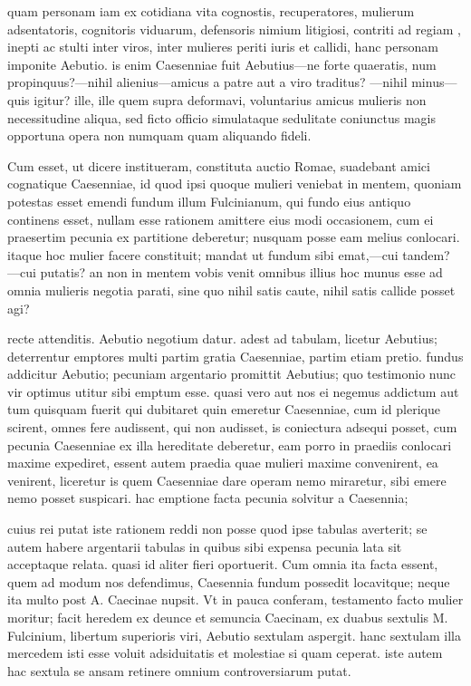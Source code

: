  quam personam iam ex cotidiana vita cognostis, recuperatores, mulierum adsentatoris, cognitoris viduarum, defensoris nimium litigiosi, contriti ad regiam , inepti ac stulti inter viros, inter mulieres periti iuris et callidi, hanc personam imponite Aebutio. is enim Caesenniae fuit Aebutius—ne forte quaeratis, num propinquus?—nihil alienius—amicus a patre aut a viro traditus? —nihil minus—quis igitur? ille, ille quem supra deformavi, voluntarius amicus mulieris non necessitudine aliqua, sed ficto officio simulataque sedulitate coniunctus magis opportuna opera non numquam quam aliquando fideli.

 Cum esset, ut dicere institueram, constituta auctio Romae, suadebant amici cognatique Caesenniae, id quod ipsi quoque mulieri veniebat in mentem, quoniam potestas esset emendi fundum illum Fulcinianum, qui fundo eius antiquo continens esset, nullam esse rationem amittere eius modi occasionem, cum ei praesertim pecunia ex partitione deberetur; nusquam posse eam melius conlocari. itaque hoc mulier facere constituit; mandat ut fundum sibi emat,—cui tandem? —cui putatis? an non in mentem vobis venit omnibus illius hoc munus esse ad omnia mulieris negotia parati, sine quo nihil satis caute, nihil satis callide posset agi?

 recte attenditis. Aebutio negotium datur. adest ad tabulam, licetur Aebutius; deterrentur emptores multi partim gratia Caesenniae, partim etiam pretio. fundus addicitur Aebutio; pecuniam argentario promittit Aebutius; quo testimonio nunc vir optimus utitur sibi emptum esse. quasi vero aut nos ei negemus addictum aut tum quisquam fuerit qui dubitaret quin emeretur Caesenniae, cum id plerique scirent, omnes fere audissent, qui non audisset, is coniectura adsequi posset, cum pecunia Caesenniae ex illa hereditate deberetur, eam porro in praediis conlocari maxime expediret, essent autem praedia quae mulieri maxime convenirent, ea venirent, liceretur is quem Caesenniae dare operam nemo miraretur, sibi emere nemo posset suspicari. hac emptione facta pecunia solvitur a Caesennia;

 cuius rei putat iste rationem reddi non posse quod ipse tabulas averterit; se autem habere argentarii tabulas in quibus sibi expensa pecunia lata sit acceptaque relata. quasi id aliter fieri oportuerit. Cum omnia ita facta essent, quem ad modum nos defendimus, Caesennia fundum possedit locavitque; neque ita multo post A. Caecinae nupsit. Vt in pauca conferam, testamento facto mulier moritur; facit heredem ex deunce et semuncia Caecinam, ex duabus sextulis M. Fulcinium, libertum superioris viri, Aebutio sextulam aspergit. hanc sextulam illa mercedem isti esse voluit adsiduitatis et molestiae si quam ceperat. iste autem hac sextula se ansam retinere omnium controversiarum putat.

